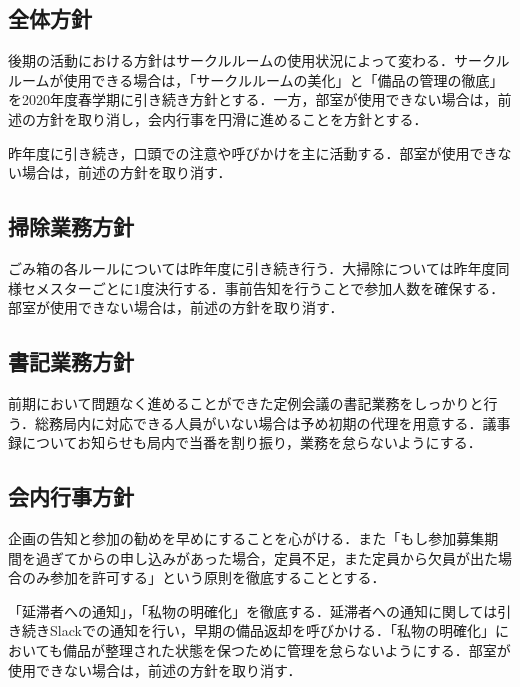 \subsection*{全体方針}
後期の活動における方針はサークルルームの使用状況によって変わる．サークルルームが使用できる場合は，「サークルルームの美化」と「備品の管理の徹底」を2020年度春学期に引き続き方針とする．一方，部室が使用できない場合は，前述の方針を取り消し，会内行事を円滑に進めることを方針とする．

昨年度に引き続き，口頭での注意や呼びかけを主に活動する．部室が使用できない場合は，前述の方針を取り消す．

\subsection*{掃除業務方針}
ごみ箱の各ルールについては昨年度に引き続き行う．大掃除については昨年度同様セメスターごとに1度決行する．事前告知を行うことで参加人数を確保する．部室が使用できない場合は，前述の方針を取り消す．

\subsection*{書記業務方針}
前期において問題なく進めることができた定例会議の書記業務をしっかりと行う．総務局内に対応できる人員がいない場合は予め初期の代理を用意する．議事録についてお知らせも局内で当番を割り振り，業務を怠らないようにする．

\subsection*{会内行事方針}
企画の告知と参加の勧めを早めにすることを心がける．また「もし参加募集期間を過ぎてからの申し込みがあった場合，定員不足，また定員から欠員が出た場合のみ参加を許可する」という原則を徹底することとする．

「延滞者への通知」，「私物の明確化」を徹底する．延滞者への通知に関しては引き続きSlackでの通知を行い，早期の備品返却を呼びかける．「私物の明確化」においても備品が整理された状態を保つために管理を怠らないようにする．部室が使用できない場合は，前述の方針を取り消す．

